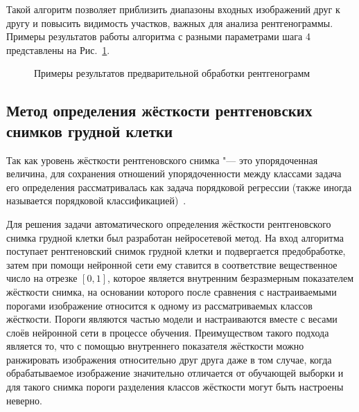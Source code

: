 Такой алгоритм позволяет приблизить диапазоны входных изображений друг к другу и повысить видимость участков, важных для анализа рентгенограммы. Примеры результатов работы алгоритма с разными параметрами шага 4 представлены на Рис.~\ref{fig:preprocessing-examples}.

\begin{figure}[ht]
	\caption{Примеры результатов предварительной обработки рентгенограмм}
	\label{fig:preprocessing-examples}
\end{figure}

\subsection{Метод определения жёсткости рентгеновских снимков грудной клетки}

Так как уровень жёсткости рентгеновского снимка "--- это упорядоченная величина, для сохранения отношений упорядоченности между классами задача его определения рассматривалась как задача порядковой регрессии (также иногда называется порядковой классификацией)~\cite{7161338, 353a0d24-9c24-3a11-a330-afc86b9c39c8}.

Для решения задачи автоматического определения жёсткости рентгеновского снимка грудной клетки был разработан нейросетевой метод. На вход алгоритма поступает рентгеновский снимок грудной клетки и подвергается предобработке, затем при помощи нейронной сети ему ставится в соответствие вещественное число на отрезке $\left[0, 1\right]$, которое является внутренним безразмерным показателем жёсткости снимка, на основании которого после сравнения с настраиваемыми порогами изображение относится к одному из рассматриваемых классов жёсткости.  Пороги являются частью модели и настраиваются вместе с весами слоёв нейронной сети в процессе обучения. Преимуществом такого подхода является то, что с помощью внутреннего показателя жёсткости можно ранжировать изображения относительно друг друга даже в том случае, когда обрабатываемое изображение значительно отличается от обучающей выборки и для такого снимка пороги разделения классов жёсткости могут быть настроены неверно.

